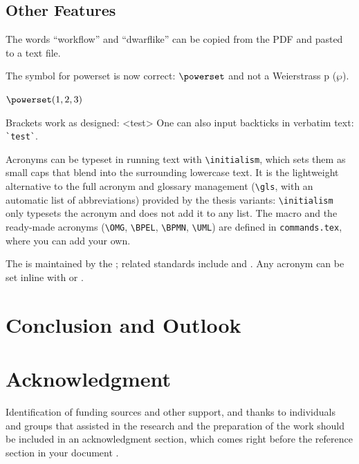 \subsection{Other Features}

\begin{ltgexample}
The words \enquote{workflow} and \enquote{dwarflike} can be copied from the PDF and pasted to a text file.
\end{ltgexample}

\begin{ltgexample}
The symbol for powerset is now correct: $\powerset$ and not a Weierstrass p ($\wp$).

$\powerset({1,2,3})$
\end{ltgexample}

\begin{ltgexample}
Brackets work as designed:
<test>
One can also input backticks in verbatim text: \verb|`test`|.
\end{ltgexample}

Acronyms can be typeset in running text with \verb+\initialism+, which sets them as small caps that blend into the surrounding lowercase text. It is the lightweight alternative to the full acronym and glossary management (\verb+\gls+, with an automatic list of abbreviations) provided by the thesis variants: \verb+\initialism+ only typesets the acronym and does not add it to any list. The macro and the ready-made acronyms (\verb+\OMG+, \verb+\BPEL+, \verb+\BPMN+, \verb+\UML+) are defined in \texttt{commands.tex}, where you can add your own.

\begin{ltgexample}
The \UML is maintained by the \OMG; related standards include \BPEL and \BPMN.
Any acronym can be set inline with  or .
\end{ltgexample}


\section{Conclusion and Outlook}
\label{sec:outlook}
\lipsum[1-2]

\section*{Acknowledgment}

Identification of funding sources and other support, and thanks to individuals and groups that assisted in the research and the preparation of the work should be included in an acknowledgment section, which comes right before the reference section in your document \cite{acmart}.

